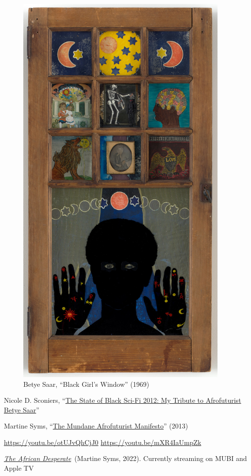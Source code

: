 \documentclass[
  letterpaper,
  DIV=11,
  numbers=noendperiod]{scrartcl}
\begin{document}
\begin{figure}

\includegraphics[width=4.16667in,height=\textheight]{../img/betye-saar.jpg} \hfill{}

\caption{Betye Saar, ``Black Girl's Window'' (1969)}

\end{figure}

Nicole D. Sconiers,
``\href{http://nicolesconiers.com/blog/2012/02/20/the-state-of-black-sci-fi-2012-my-tribute-to-afrofuturist-betye-saar/}{The
State of Black Sci-Fi 2012: My Tribute to Afrofuturist Betye Saar}''

Martine Syms,
``\href{http://thirdrailquarterly.org/martine-syms-the-mundane-afrofuturist-manifesto/}{The
Mundane Afrofuturist Manifesto}'' (2013)

\url{https://youtu.be/otUJvQhCjJ0} \url{https://youtu.be/mXR4IaUmpZk}

\href{https://mubi.com/films/the-african-desperate}{\emph{The African
Desperate}}~(Martine Syms, 2022). Currently streaming on MUBI and Apple
TV
\end{document}
